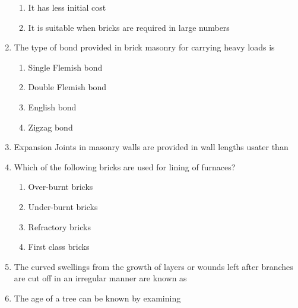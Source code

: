 \documentclass[11pt,a4paper]{article}
\begin{document}
\begin{enumerate}
\begin{enumerate}[label=\Alph*.]
\item{It has less initial cost}
\item{It is suitable when bricks are required in large numbers}
\end{enumerate}
\item{The type of bond provided in brick masonry for carrying heavy loads is}
\begin{enumerate}[label=\Alph*.]
\item{Single Flemish bond}
\item{Double Flemish bond}
\item{English bond}
\item{Zigzag bond}
\end{enumerate}
\item{Expansion Joints in masonry walls are provided in wall lengths usater than}
\\
\item{Which of the following bricks are used for lining of furnaces?}
\begin{enumerate}[label=\Alph*.]
\item{Over-burnt bricks}
\item{Under-burnt bricks}
\item{Refractory bricks}
\item{First class bricks}
\end{enumerate}
\item{The curved swellings from the growth of layers or wounds left after branches are cut off in an irregular manner are known as}
\\
\item{The age of a tree can be known by examining}
\\
\end{enumerate}
\end{document}
